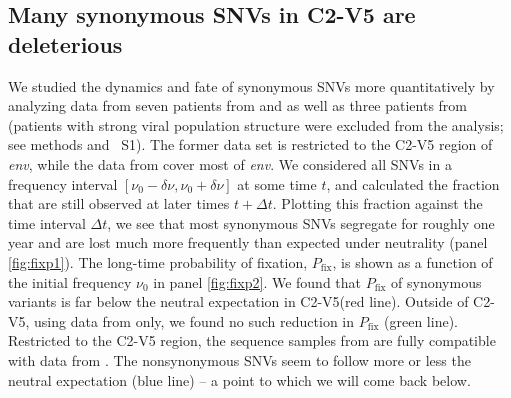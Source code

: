 \documentclass[rmp, twocolumn]{revtex4}
\newcommand{\pfix}{P_{\mathrm{fix}}}
\newcommand{\env}{\textit{env}}
\newcommand{\shankaregion}{C2-V5}
\newcommand{\PCApat}{1}
\begin{document}
\subsection*{Many synonymous SNVs in \shankaregion{} are deleterious}
We studied the dynamics and fate of synonymous SNVs more quantitatively by
analyzing data from seven patients from \citet{shankarappa_consistent_1999} and
\citet{liu_selection_2006} as well as three patients from
\citet{bunnik_autologous_2008} (patients with strong viral population structure
were excluded from the analysis; see methods and \figurename~S\PCApat). The
former data set is restricted to the \shankaregion{} region of \env, while the
data from \citet{bunnik_autologous_2008} cover most of \env.  We considered all
SNVs in a frequency interval $[\nu_0-\delta\nu, \nu_0+\delta\nu]$ at some time
$t$, and calculated the fraction that are still observed at later times $t+\Delta
t$. Plotting this fraction against the time interval $\Delta t$, we see that
most synonymous SNVs segregate for roughly one year and are lost much more
frequently than expected under neutrality (panel \ref{fig:fixp1}). The long-time
probability of fixation, $\pfix$, is shown as a function of the initial
frequency $\nu_0$ in panel \ref{fig:fixp2}. We found that $\pfix$ of synonymous
variants is far below the neutral expectation in \shankaregion (red line).
Outside of \shankaregion, using data from \citet{bunnik_autologous_2008} only,
we found no such reduction in $\pfix$ (green line). Restricted to the
\shankaregion{} region, the sequence samples from \citet{bunnik_autologous_2008}
are fully compatible with data from \citet{shankarappa_consistent_1999}. The
nonsynonymous SNVs seem to follow more or less the neutral expectation (blue
line) -- a point to which we will come back below.
\end{document}

